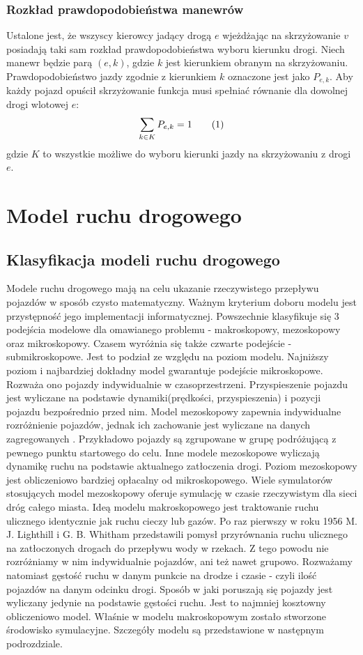\documentclass[12pt]{book}
\newcommand\addtag{\refstepcounter{equation}\tag{\theequation}}
\begin{document}
\subsection{Rozkład prawdopodobieństwa manewrów}
Ustalone jest, że wszyscy kierowcy jadący drogą $e$ wjeżdżając na skrzyżowanie $v$ posiadają taki sam rozkład prawdopodobieństwa wyboru kierunku drogi.
Niech manewr  będzie parą $(e,k)$, gdzie $k$ jest kierunkiem obranym na skrzyżowaniu. Prawdopodobieństwo jazdy zgodnie z kierunkiem $k$ oznaczone jest jako  $P_{e,k}$. Aby każdy pojazd opuścił skrzyżowanie funkcja musi spełniać równanie dla dowolnej drogi wlotowej $e$: 
\[
\sum_{k\in K}P_{e,k}=1 \addtag
\]
gdzie $K$ to wszystkie możliwe do wyboru kierunki jazdy na skrzyżowaniu z drogi $e$.

\chapter{Model ruchu drogowego}
\section{Klasyfikacja modeli ruchu drogowego} 
Modele ruchu drogowego mają na celu ukazanie rzeczywistego przepływu pojazdów w sposób czysto matematyczny. Ważnym kryterium doboru modelu jest przystępność jego implementacji informatycznej. Powszechnie klasyfikuje się 3 podejścia modelowe dla omawianego problemu \cite{CompareModels} - makroskopowy, mezoskopowy oraz mikroskopowy. Czasem \cite{multilevel} wyróżnia się także czwarte podejście - submikroskopowe. Jest to podział ze względu na poziom modelu. Najniższy poziom i najbardziej dokładny model gwarantuje podejście mikroskopowe. Rozważa ono pojazdy indywidualnie w czasoprzestrzeni. Przyspieszenie pojazdu jest wyliczane na podstawie dynamiki(prędkości, przyspieszenia) i pozycji pojazdu bezpośrednio przed nim. Model mezoskopowy zapewnia indywidualne rozróżnienie pojazdów, jednak ich zachowanie jest wyliczane na danych zagregowanych \cite{mesoscopic}. Przykładowo pojazdy są zgrupowane w grupę podróżującą z pewnego punktu startowego do celu. Inne modele \cite{mesoscopic2} mezoskopowe wyliczają dynamikę ruchu na podstawie aktualnego zatłoczenia drogi. Poziom mezoskopowy jest obliczeniowo bardziej opłacalny od mikroskopowego.
Wiele symulatorów stosujących model mezoskopowy oferuje symulację w czasie rzeczywistym dla sieci dróg całego miasta\cite{vu2017high}. Ideą modelu makroskopowego jest traktowanie ruchu ulicznego identycznie jak ruchu cieczy lub gazów. Po raz pierwszy w roku 1956 M. J. Lighthill i G. B. Whitham \cite{lwr} przedstawili pomysł przyrównania ruchu ulicznego na zatłoczonych drogach do przepływu wody w rzekach. Z tego powodu nie rozróżniamy w nim indywidualnie pojazdów, ani też nawet grupowo. Rozważamy natomiast gęstość ruchu w danym punkcie na drodze i czasie - czyli ilość pojazdów na danym odcinku drogi. Sposób w jaki poruszają się pojazdy jest wyliczany jedynie na podstawie gęstości ruchu. Jest to najmniej kosztowny obliczeniowo model. Właśnie w modelu makroskopowym zostało stworzone środowisko symulacyjne. Szczegóły modelu są przedstawione w następnym podrozdziale.
\end{document}
